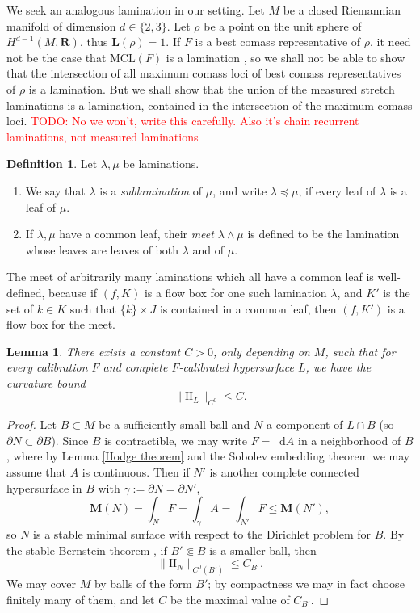 \documentclass[reqno,11pt]{amsart}
\newcommand{\RR}{\mathbf{R}}
\newcommand*\dif{\mathop{}\!\mathrm{d}}
\newcommand{\Two}{\mathrm{I\!I}}
\newcommand{\MCL}{\mathrm{MCL}}
\newcommand{\Mass}{\mathbf M}
\newcommand{\Comass}{\mathbf L}
\newcommand{\dfn}[1]{\emph{#1}\index{#1}}
\newtheorem{lemma}[theorem]{Lemma}
\theoremstyle{definition}
\newtheorem{definition}[theorem]{Definition}
\numberwithin{equation}{section}
\newcommand\todo[1]{\textcolor{red}{TODO: #1}}
\begin{document}
We seek an analogous lamination in our setting.
Let $M$ be a closed Riemannian manifold of dimension $d \in \{2, 3\}$.
Let $\rho$ be a point on the unit sphere of $H^{d - 1}(M, \RR)$, thus $\Comass(\rho) = 1$.
If $F$ is a best comass representative of $\rho$, it need not be the case that $\MCL(F)$ is a lamination \cite[Example 5.4]{bangert_cui_2017}, so we shall not be able to show that the intersection of all maximum comass loci of best comass representatives of $\rho$ is a lamination.
But we shall show that the union of the measured stretch laminations is a lamination, contained in the intersection of the maximum comass loci.
\todo{No we won't, write this carefully. Also it's chain recurrent laminations, not measured laminations}

\begin{definition}
Let $\lambda, \mu$ be laminations.
\begin{enumerate}
\item We say that $\lambda$ is a \dfn{sublamination} of $\mu$, and write $\lambda \preceq \mu$, if every leaf of $\lambda$ is a leaf of $\mu$.
\item If $\lambda, \mu$ have a common leaf, their \dfn{meet} $\lambda \wedge \mu$ is defined to be the lamination whose leaves are leaves of both $\lambda$ and of $\mu$.
\end{enumerate}
\end{definition}

The meet of arbitrarily many laminations which all have a common leaf is well-defined, because if $(f, K)$ is a flow box for one such lamination $\lambda$, and $K'$ is the set of $k \in K$ such that $\{k\} \times J$ is contained in a common leaf, then $(f, K')$ is a flow box for the meet.

\begin{lemma}
There exists a constant $C > 0$, only depending on $M$, such that for every calibration $F$ and complete $F$-calibrated hypersurface $L$, we have the curvature bound
\begin{equation}\label{curvature bound for calibrated}
\|\Two_L\|_{C^0} \leq C.
\end{equation}
\end{lemma}
\begin{proof}
Let $B \subset M$ be a sufficiently small ball and $N$ a component of $L \cap B$ (so $\partial N \subset \partial B$).
Since $B$ is contractible, we may write $F = \dif A$ in a neighborhood of $B$, where by Lemma \ref{Hodge theorem} and the Sobolev embedding theorem we may assume that $A$ is continuous.
Then if $N'$ is another complete connected hypersurface in $B$ with $\gamma := \partial N = \partial N'$,
$$\Mass(N) = \int_N F = \int_\gamma A = \int_{N'} F \leq \Mass(N'),$$
so $N$ is a stable minimal surface with respect to the Dirichlet problem for $B$.
By the stable Bernstein theorem \cite[Theorem 2.10]{colding2011course}, if $B' \Subset B$ is a smaller ball, then
$$\|\Two_N\|_{C^0(B')} \leq C_{B'}.$$
We may cover $M$ by balls of the form $B'$; by compactness we may in fact choose finitely many of them, and let $C$ be the maximal value of $C_{B'}$.
\end{proof}
\end{document}
